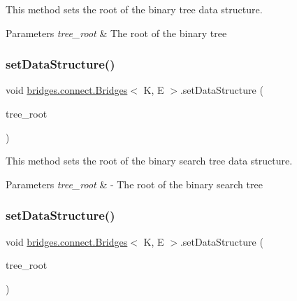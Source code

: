 This method sets the root of the binary tree data structure.


\begin{DoxyParams}{Parameters}
{\em tree\+\_\+root} & The root of the binary tree \\
\hline
\end{DoxyParams}
\hypertarget{classbridges_1_1connect_1_1_bridges_adb01a9385de48ef267bdfd22758fb361}{}\label{classbridges_1_1connect_1_1_bridges_adb01a9385de48ef267bdfd22758fb361} 
\subsubsection{\texorpdfstring{set\+Data\+Structure()}{setDataStructure()}\hspace{0.1cm}{\footnotesize\ttfamily [9/12]}}
{\footnotesize\ttfamily void \hyperlink{classbridges_1_1connect_1_1_bridges}{bridges.\+connect.\+Bridges}$<$ K, E $>$.set\+Data\+Structure (\begin{DoxyParamCaption}\item[{\hyperlink{classbridges_1_1base_1_1_b_s_t_element}{B\+S\+T\+Element}$<$ K, E $>$}]{tree\+\_\+root }\end{DoxyParamCaption})}

This method sets the root of the binary search tree data structure.


\begin{DoxyParams}{Parameters}
{\em tree\+\_\+root} & -\/ The root of the binary search tree \\
\hline
\end{DoxyParams}
\hypertarget{classbridges_1_1connect_1_1_bridges_a702c3f88840e100ad0182110627e60f5}{}\label{classbridges_1_1connect_1_1_bridges_a702c3f88840e100ad0182110627e60f5} 
\subsubsection{\texorpdfstring{set\+Data\+Structure()}{setDataStructure()}\hspace{0.1cm}{\footnotesize\ttfamily [10/12]}}
{\footnotesize\ttfamily void \hyperlink{classbridges_1_1connect_1_1_bridges}{bridges.\+connect.\+Bridges}$<$ K, E $>$.set\+Data\+Structure (\begin{DoxyParamCaption}\item[{\hyperlink{classbridges_1_1base_1_1_a_v_l_tree_element}{A\+V\+L\+Tree\+Element}$<$ K, E $>$}]{tree\+\_\+root }\end{DoxyParamCaption})}

